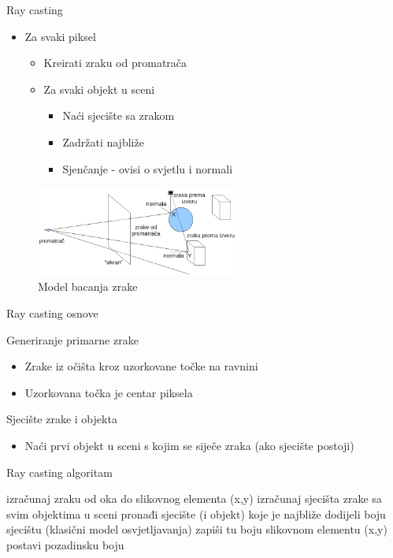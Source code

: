 \documentclass[9pt]{beamer}
\begin{document}
\begin{frame}{Ray casting}
\begin{itemize}
	\item Za svaki piksel
	\begin{itemize}
		\item Kreirati zraku od promatrača
		\item Za svaki objekt u sceni
		\begin{itemize}
			\item Naći sjecište sa zrakom
			\item Zadržati najbliže
			\item Sjenčanje - ovisi o svjetlu i normali
		\end{itemize}
	\end{itemize}
\end{itemize}
\begin{figure}
	 \includegraphics[width=0.6\textwidth]{./slike/model_bacanja_zrake.png}
	 \caption{Model bacanja zrake}
\end{figure}
\end{frame}	

\begin{frame}{Ray casting osnove}
\begin{block}{Generiranje primarne zrake}
	\begin{itemize}
		\item Zrake iz očišta kroz uzorkovane točke na ravnini
		\item Uzorkovana točka je centar piksela
	\end{itemize}
\end{block}
\begin{block}{Sjecište zrake i objekta}
	\begin{itemize}
		\item Naći prvi objekt u sceni s kojim se siječe zraka (ako sjecište postoji)
	\end{itemize}
\end{block}
\end{frame}

\begin{frame}{Ray casting algoritam}
\begin{algorithm*}[H]
	{
		izračunaj zraku od oka do slikovnog elementa (x,y)\;
		izračunaj sjecišta zrake sa svim objektima u sceni\;
		pronađi sjecište (i objekt) koje je najbliže\;
		{
			dodijeli boju sjecištu (klasični model osvjetljavanja)\;
			zapiši tu boju slikovnom elementu (x,y)\;
		}\Else
		{
			postavi pozadinsku boju\;
		}
	}
\end{algorithm*}
\end{frame}
\end{document}
